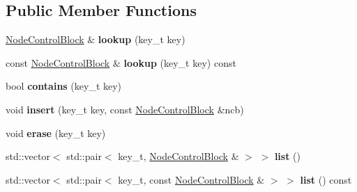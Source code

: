 \subsection*{Public Member Functions}
\begin{DoxyCompactItemize}
\item 
\mbox{\label{class_hash_octree_1_1_map_lookup_method_ac226e4793af4d493451974f056691c06}} 
\mbox{\hyperlink{class_hash_octree_1_1_node_control_block}{Node\+Control\+Block}} \& {\bfseries lookup} (key\+\_\+t key)
\item 
\mbox{\label{class_hash_octree_1_1_map_lookup_method_ad092d8b2df8efe36c2e3c24d7bdfad43}} 
const \mbox{\hyperlink{class_hash_octree_1_1_node_control_block}{Node\+Control\+Block}} \& {\bfseries lookup} (key\+\_\+t key) const
\item 
\mbox{\label{class_hash_octree_1_1_map_lookup_method_afef7db4847b23a81137afa921915ffa0}} 
bool {\bfseries contains} (key\+\_\+t key)
\item 
\mbox{\label{class_hash_octree_1_1_map_lookup_method_ab56c8f3c99671df22b0d8ade4ccabb46}} 
void {\bfseries insert} (key\+\_\+t key, const \mbox{\hyperlink{class_hash_octree_1_1_node_control_block}{Node\+Control\+Block}} \&ncb)
\item 
\mbox{\label{class_hash_octree_1_1_map_lookup_method_a1179a856997e2c6feaf30a3aa0060611}} 
void {\bfseries erase} (key\+\_\+t key)
\item 
\mbox{\label{class_hash_octree_1_1_map_lookup_method_adf3471a4f1114b6304026391cd6ae7ec}} 
std\+::vector$<$ std\+::pair$<$ key\+\_\+t, \mbox{\hyperlink{class_hash_octree_1_1_node_control_block}{Node\+Control\+Block}} \& $>$ $>$ {\bfseries list} ()
\item 
\mbox{\label{class_hash_octree_1_1_map_lookup_method_a9374b94be85a96e3f9b85f7d9fd954dd}} 
std\+::vector$<$ std\+::pair$<$ key\+\_\+t, const \mbox{\hyperlink{class_hash_octree_1_1_node_control_block}{Node\+Control\+Block}} \& $>$ $>$ {\bfseries list} () const
\end{DoxyCompactItemize}


